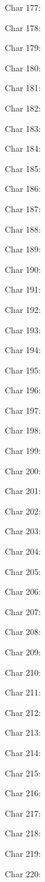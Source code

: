 Char 177: 

Char 178: 

Char 179: 

Char 180: 

Char 181: 

Char 182: 

Char 183: 

Char 184: 

Char 185: 

Char 186: 

Char 187: 

Char 188: 

Char 189: 

Char 190: 

Char 191: 

Char 192: 

Char 193: 

Char 194: 

Char 195: 

Char 196: 

Char 197: 

Char 198: 

Char 199: 

Char 200: 

Char 201: 

Char 202: 

Char 203: 

Char 204: 

Char 205: 

Char 206: 

Char 207: 

Char 208: 

Char 209: 

Char 210: 

Char 211: 

Char 212: 

Char 213: 

Char 214: 

Char 215: 

Char 216: 

Char 217: 

Char 218: 

Char 219: 

Char 220: 


